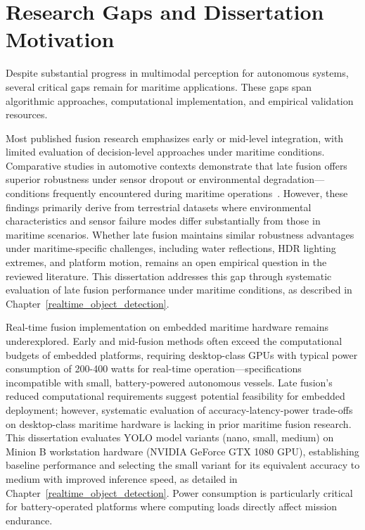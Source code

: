 \documentclass{erauthesis}
\begin{document}
\section{Research Gaps and Dissertation Motivation}

Despite substantial progress in multimodal perception for autonomous systems, several critical gaps remain for maritime applications.
These gaps span algorithmic approaches, computational implementation, and empirical validation resources.

Most published fusion research emphasizes early or mid-level integration, with limited evaluation of decision-level approaches under maritime conditions.
Comparative studies in automotive contexts demonstrate that late fusion offers superior robustness under sensor dropout or environmental degradation—conditions frequently encountered during maritime operations~\cite{huang2024a, wang2020a}.
However, these findings primarily derive from terrestrial datasets where environmental characteristics and sensor failure modes differ substantially from those in maritime scenarios.
Whether late fusion maintains similar robustness advantages under maritime-specific challenges, including water reflections, HDR lighting extremes, and platform motion, remains an open empirical question in the reviewed literature.
This dissertation addresses this gap through systematic evaluation of late fusion performance under maritime conditions, as described in Chapter~\ref{realtime_object_detection}.

Real-time fusion implementation on embedded maritime hardware remains underexplored.
Early and mid-fusion methods often exceed the computational budgets of embedded platforms, requiring desktop-class GPUs with typical power consumption of 200-400 watts for real-time operation—specifications incompatible with small, battery-powered autonomous vessels.
Late fusion's reduced computational requirements suggest potential feasibility for embedded deployment; however, systematic evaluation of accuracy-latency-power trade-offs on desktop-class maritime hardware is lacking in prior maritime fusion research.
This dissertation evaluates YOLO model variants (nano, small, medium) on Minion B workstation hardware (NVIDIA GeForce GTX 1080 GPU), establishing baseline performance and selecting the small variant for its equivalent accuracy to medium with improved inference speed, as detailed in Chapter~\ref{realtime_object_detection}.
Power consumption is particularly critical for battery-operated platforms where computing loads directly affect mission endurance.
\end{document}
